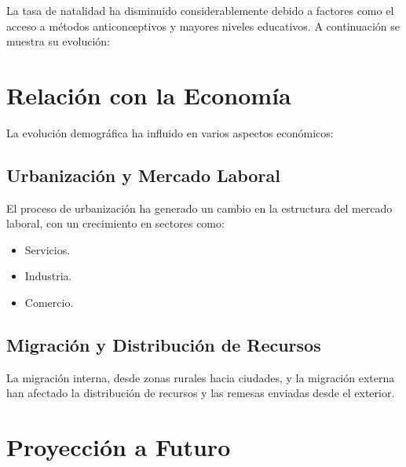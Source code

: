 \documentclass{article}
\begin{document}
La tasa de natalidad ha disminuido considerablemente debido a factores como el acceso a métodos anticonceptivos y mayores niveles educativos. A continuación se muestra su evolución:


\section{Relación con la Economía}

La evolución demográfica ha influido en varios aspectos económicos:

\subsection{Urbanización y Mercado Laboral}

El proceso de urbanización ha generado un cambio en la estructura del mercado laboral, con un crecimiento en sectores como:

\begin{itemize}
    \item Servicios.
    \item Industria.
    \item Comercio.
\end{itemize}

\subsection{Migración y Distribución de Recursos}

La migración interna, desde zonas rurales hacia ciudades, y la migración externa han afectado la distribución de recursos y las remesas enviadas desde el exterior.

\section{Proyección a Futuro}
\end{document}

